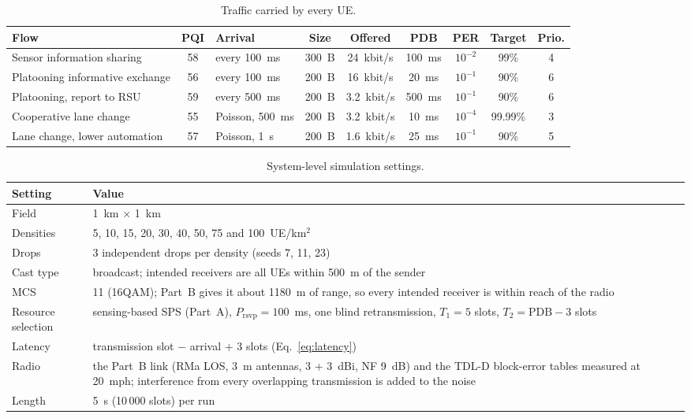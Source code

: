 \documentclass{article}
\newcommand{\Tone}{T_1}
\newcommand{\Ttwo}{T_2}
\newcommand{\Prsvp}{P_{\mathrm{rsvp}}}
\begin{document}
\begin{table}[H]
\centering
\caption{Traffic carried by every UE.}
\label{tab:flows}
\footnotesize\setlength{\tabcolsep}{3.5pt}
\begin{tabularx}{\textwidth}{X c l c c c c c c}
\toprule
\textbf{Flow} & \textbf{PQI} & \textbf{Arrival} & \textbf{Size} & \textbf{Offered} & \textbf{PDB} & \textbf{PER} & \textbf{Target} & \textbf{Prio.} \\
\midrule
Sensor information sharing & 58 & every 100~ms & 300~B & 24~kbit/s & 100~ms & $10^{-2}$ & 99\% & 4 \\
Platooning informative exchange & 56 & every 100~ms & 200~B & 16~kbit/s & 20~ms & $10^{-1}$ & 90\% & 6 \\
Platooning, report to RSU & 59 & every 500~ms & 200~B & 3.2~kbit/s & 500~ms & $10^{-1}$ & 90\% & 6 \\
Cooperative lane change & 55 & Poisson, 500~ms & 200~B & 3.2~kbit/s & 10~ms & $10^{-4}$ & 99.99\% & 3 \\
Lane change, lower automation & 57 & Poisson, 1~s & 200~B & 1.6~kbit/s & 25~ms & $10^{-1}$ & 90\% & 5 \\
\bottomrule
\end{tabularx}
\end{table}

\begin{table}[H]
\centering
\caption{System-level simulation settings.}
\label{tab:sls}
\small
\begin{tabularx}{\textwidth}{l X}
\toprule
\textbf{Setting} & \textbf{Value} \\
\midrule
Field & 1~km $\times$ 1~km \\
Densities & 5, 10, 15, 20, 30, 40, 50, 75 and 100~UE/km$^2$ \\
Drops & 3 independent drops per density (seeds 7, 11, 23) \\
Cast type & broadcast; intended receivers are all UEs within 500~m of the sender \\
MCS & 11 (16QAM); Part~B gives it about 1180~m of range, so every intended receiver is within reach of the radio \\
Resource selection & sensing-based SPS (Part~A), $\Prsvp = 100$~ms, one blind retransmission, $\Tone = 5$ slots, $\Ttwo = \mathrm{PDB} - 3$ slots \\
Latency & transmission slot $-$ arrival $+$ 3 slots (Eq.~\eqref{eq:latency}) \\
Radio & the Part~B link (RMa LOS, 3~m antennas, 3 + 3~dBi, NF 9~dB) and the TDL-D block-error tables measured at 20~mph; interference from every overlapping transmission is added to the noise \\
Length & 5~s (10\,000 slots) per run \\
\bottomrule
\end{tabularx}
\end{table}
\end{document}
